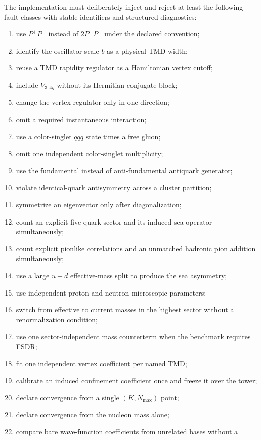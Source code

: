 \documentclass[11pt]{article}
\begin{document}
The implementation must deliberately inject and reject at least the following
fault classes with stable identifiers and structured diagnostics:
\begin{enumerate}
 \item use \(P^+P^-\) instead of \(2P^+P^-\) under the declared convention;
 \item identify the oscillator scale \(b\) as a physical TMD width;
 \item reuse a TMD rapidity regulator as a Hamiltonian vertex cutoff;
 \item include \(V_{3,4g}\) without its Hermitian-conjugate block;
 \item change the vertex regulator only in one direction;
 \item omit a required instantaneous interaction;
 \item use a color-singlet \(qqq\) state times a free gluon;
 \item omit one independent color-singlet multiplicity;
 \item use the fundamental instead of anti-fundamental antiquark generator;
 \item violate identical-quark antisymmetry across a cluster partition;
 \item symmetrize an eigenvector only after diagonalization;
 \item count an explicit five-quark sector and its induced sea operator
 simultaneously;
 \item count explicit pionlike correlations and an unmatched hadronic pion
 addition simultaneously;
 \item use a large \(u-d\) effective-mass split to produce the sea asymmetry;
 \item use independent proton and neutron microscopic parameters;
 \item switch from effective to current masses in the highest sector without a
 renormalization condition;
 \item use one sector-independent mass counterterm when the benchmark requires
 FSDR;
 \item fit one independent vertex coefficient per named TMD;
 \item calibrate an induced confinement coefficient once and freeze it over the
 tower;
 \item declare convergence from a single \((K,N_{\max})\) point;
 \item declare convergence from the nucleon mass alone;
 \item compare bare wave-function coefficients from unrelated bases without a

\end{enumerate}
\end{document}
